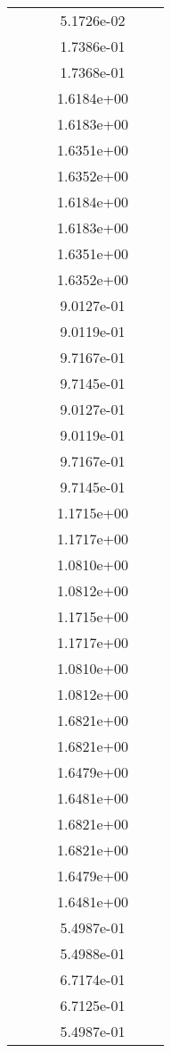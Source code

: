 \begin{xltabular}{\textwidth}{r|rS[table-format=1.3e+2]S[table-format=1.4e+2]S[table-format=1.4e+2]S[table-format=-1.5]}
&  &  & 5.1726e-02 & & \\
&  &  & 1.7386e-01 & & \\
&  &  & 1.7368e-01 & & \\
&  &  & 1.6184e+00 & & \\
&  &  & 1.6183e+00 & & \\
&  &  & 1.6351e+00 & & \\
&  &  & 1.6352e+00 & & \\
&  &  & 1.6184e+00 & & \\
&  &  & 1.6183e+00 & & \\
&  &  & 1.6351e+00 & & \\
&  &  & 1.6352e+00 & & \\
&  &  & 9.0127e-01 & & \\
&  &  & 9.0119e-01 & & \\
&  &  & 9.7167e-01 & & \\
&  &  & 9.7145e-01 & & \\
&  &  & 9.0127e-01 & & \\
&  &  & 9.0119e-01 & & \\
&  &  & 9.7167e-01 & & \\
&  &  & 9.7145e-01 & & \\
&  &  & 1.1715e+00 & & \\
&  &  & 1.1717e+00 & & \\
&  &  & 1.0810e+00 & & \\
&  &  & 1.0812e+00 & & \\
&  &  & 1.1715e+00 & & \\
&  &  & 1.1717e+00 & & \\
&  &  & 1.0810e+00 & & \\
&  &  & 1.0812e+00 & & \\
&  &  & 1.6821e+00 & & \\
&  &  & 1.6821e+00 & & \\
&  &  & 1.6479e+00 & & \\
&  &  & 1.6481e+00 & & \\
&  &  & 1.6821e+00 & & \\
&  &  & 1.6821e+00 & & \\
&  &  & 1.6479e+00 & & \\
&  &  & 1.6481e+00 & & \\
&  &  & 5.4987e-01 & & \\
&  &  & 5.4988e-01 & & \\
&  &  & 6.7174e-01 & & \\
&  &  & 6.7125e-01 & & \\
&  &  & 5.4987e-01 & & \\

\end{xltabular}
